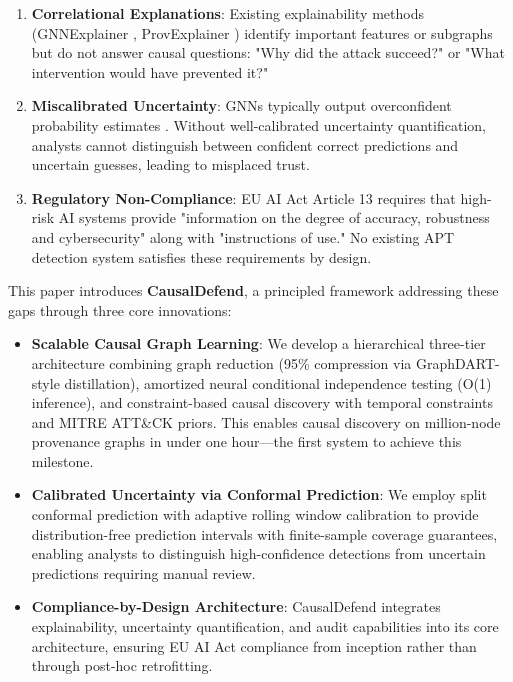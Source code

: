 \documentclass[conference]{IEEEtran}
\begin{document}
\begin{enumerate}
    \item \textbf{Correlational Explanations}: Existing explainability methods (GNNExplainer \cite{gnnexplainer}, ProvExplainer \cite{provexplainer}) identify important features or subgraphs but do not answer causal questions: "Why did the attack succeed?" or "What intervention would have prevented it?"
    
    \item \textbf{Miscalibrated Uncertainty}: GNNs typically output overconfident probability estimates \cite{gnn_calibration}. Without well-calibrated uncertainty quantification, analysts cannot distinguish between confident correct predictions and uncertain guesses, leading to misplaced trust.
    
    \item \textbf{Regulatory Non-Compliance}: EU AI Act Article 13 requires that high-risk AI systems provide "information on the degree of accuracy, robustness and cybersecurity" along with "instructions of use." No existing APT detection system satisfies these requirements by design.
\end{enumerate}

This paper introduces \textbf{CausalDefend}, a principled framework addressing these gaps through three core innovations:

\begin{itemize}
    \item \textbf{Scalable Causal Graph Learning}: We develop a hierarchical three-tier architecture combining graph reduction (95\% compression via GraphDART-style distillation), amortized neural conditional independence testing (O(1) inference), and constraint-based causal discovery with temporal constraints and MITRE ATT\&CK priors. This enables causal discovery on million-node provenance graphs in under one hour—the first system to achieve this milestone.
    
    \item \textbf{Calibrated Uncertainty via Conformal Prediction}: We employ split conformal prediction \cite{conformal_survey} with adaptive rolling window calibration to provide distribution-free prediction intervals with finite-sample coverage guarantees, enabling analysts to distinguish high-confidence detections from uncertain predictions requiring manual review.
    
    \item \textbf{Compliance-by-Design Architecture}: CausalDefend integrates explainability, uncertainty quantification, and audit capabilities into its core architecture, ensuring EU AI Act compliance from inception rather than through post-hoc retrofitting.
\end{itemize}
\end{document}

